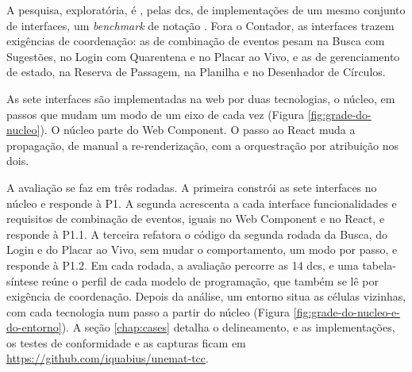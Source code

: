 
A pesquisa, exploratória, é , pelas \glspl{dc}, de
implementações de um mesmo conjunto de interfaces, um \emph{benchmark} de
notação \cite[p. 114]{kiss2014}.
Fora o Contador, as interfaces trazem exigências de coordenação: as de
combinação de eventos pesam na Busca com Sugestões, no Login com
Quarentena e no Placar ao Vivo, e as de gerenciamento de estado, na
Reserva de Passagem, na Planilha e no Desenhador de Círculos.

As sete interfaces são implementadas na web por duas tecnologias, o
núcleo, em passos que mudam um modo de um eixo de cada vez
(Figura \ref{fig:grade-do-nucleo}).
O núcleo parte do Web Component.
O passo ao React muda a propagação, de manual a re-renderização, com a
orquestração por atribuição nos dois.

A avaliação se faz em três rodadas.
A primeira constrói as sete interfaces no núcleo e responde à P1.
A segunda acrescenta a cada interface funcionalidades e requisitos de
combinação de eventos, iguais no Web Component e no React, e responde
à P1.1.
A terceira refatora o código da segunda rodada da Busca, do Login e do
Placar ao Vivo, sem mudar o comportamento, um modo por passo, e
responde à P1.2.
Em cada rodada, a avaliação percorre as 14 \glspl{dc}, e uma
tabela-síntese reúne o perfil de cada modelo de programação, que também
se lê por exigência de coordenação.
Depois da análise, um entorno situa as células vizinhas, com cada
tecnologia num passo a partir do núcleo
(Figura \ref{fig:grade-do-nucleo-e-do-entorno}).
A seção \ref{chap:cases} detalha o delineamento, e as implementações, os
testes de conformidade e as capturas ficam em
\url{https://github.com/iquabius/unemat-tcc}.

